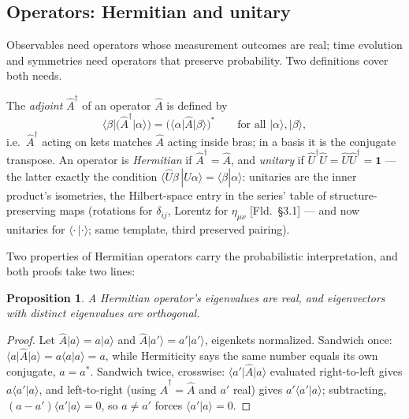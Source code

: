 \documentclass[11pt]{article}
\theoremstyle{plain}
\newtheorem{proposition}[theorem]{Proposition}
\theoremstyle{definition}
\theoremstyle{remark}
\newcommand{\op}[1]{\hat{#1}}
\newcommand{\idop}{\mathbf{1}}  %
\newcommand{\ket}[1]{\lvert #1 \rangle}
\newcommand{\bra}[1]{\langle #1 \rvert}
\newcommand{\braket}[2]{\langle #1 | #2 \rangle}
\begin{document}
\subsection{Operators: Hermitian and unitary}
\label{sec:operators}

Observables need operators whose measurement outcomes are real; time
evolution and symmetries need operators that preserve probability.
Two definitions cover both needs.

The \emph{adjoint} $\op A^\dagger$ of an operator $\op A$ is defined
by
\begin{equation}
  \bra\beta\bigl(\op A^\dagger\ket\alpha\bigr)
  = \bigl(\bra\alpha\op A\ket\beta\bigr)^{*}
  \qquad\text{for all } \ket\alpha, \ket\beta,
\end{equation}
i.e.\ $\op A^\dagger$ acting on kets matches $\op A$ acting inside
bras; in a basis it is the conjugate transpose. An operator is
\emph{Hermitian} if $\op A^\dagger = \op A$, and \emph{unitary} if
$\op U^\dagger\op U = \op U\op U^\dagger = \idop$ --- the latter
exactly the condition $\braket{\op U\beta\,}{\op U\alpha} =
\braket\beta\alpha$: unitaries are the inner product's isometries,
the Hilbert-space entry in the series' table of
structure-preserving maps (rotations for $\delta_{ij}$, Lorentz for
$\eta_{\mu\nu}$ [Fld.\ \S3.1] --- and now unitaries for
$\braket{\cdot\,}{\cdot}$; same template, third preserved pairing).

Two properties of Hermitian operators carry the probabilistic
interpretation, and both proofs take two lines:

\begin{proposition}\label{prop:hermitian-spectrum}
A Hermitian operator's eigenvalues are real, and eigenvectors with
distinct eigenvalues are orthogonal.
\end{proposition}

\begin{proof}
Let $\op A\ket a = a\ket a$ and $\op A\ket{a'} = a'\ket{a'}$,
eigenkets normalized. Sandwich once:
$\bra a\op A\ket a = a\braket aa = a$, while Hermiticity says the
same number equals its own conjugate, $a = a^{*}$. Sandwich twice,
crosswise: $\bra{a'}\op A\ket a$ evaluated right-to-left gives
$a\braket{a'}a$, and left-to-right (using $\op A^\dagger = \op A$
and $a'$ real) gives $a'\braket{a'}a$; subtracting,
$(a - a')\braket{a'\!}a = 0$, so $a \ne a'$ forces
$\braket{a'\!}a = 0$.
\end{proof}
\end{document}
